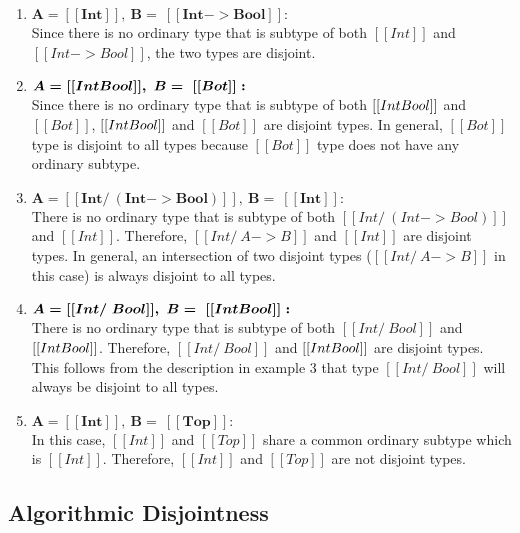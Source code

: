 \begin{enumerate}
  \item $\boldsymbol{A = [[Int]], \ B = \ [[Int -> Bool]]:}$ \\
        Since there is no ordinary type that is subtype of both $[[Int]]$ and $[[Int -> Bool]]$,
        the two types are disjoint.
  \item $\boldsymbol{A = [[Int \/ Bool]], \ B = \ [[Bot]]:}$ \\
    Since there is no ordinary type that is subtype of both $[[Int \/ Bool]]$ and $[[Bot]]$,
    $[[Int \/ Bool]]$ and $[[Bot]]$ are disjoint types.
    In general, $[[Bot]]$ type is disjoint to all types because $[[Bot]]$ type does not
    have any ordinary subtype.
  \item $\boldsymbol{A = [[Int /\ (Int -> Bool)]], \ B = \ [[Int]]:}$ \\
        There is no ordinary type that is subtype of both $[[Int /\ (Int -> Bool)]]$ and $[[Int]]$.
        Therefore, $[[Int /\ A -> B]]$ and $[[Int]]$ are disjoint types.
        In general, an intersection of two disjoint types ($[[Int /\ A -> B]]$ in this case)
        is always disjoint to all types.
  \item $\boldsymbol{A = [[Int /\ Bool]], \ B = \ [[Int \/ Bool]]:}$ \\
        There is no ordinary type that is subtype of both $[[Int /\ Bool]]$ and $[[Int \/ Bool]]$.
        Therefore, $[[Int /\ Bool]]$ and $[[Int \/ Bool]]$ are disjoint types.
        This follows from the description in example 3 that type $[[Int /\ Bool]]$ will always be
        disjoint to all types.
  \item $\boldsymbol{A = [[Int]], \ B = \ [[Top]]:}$ \\
        In this case, $[[Int]]$ and $[[Top]]$ share a common ordinary subtype which is $[[Int]]$.
        Therefore, $[[Int]]$ and $[[Top]]$ are not disjoint types.
\end{enumerate}


\subsection{Algorithmic Disjointness}

